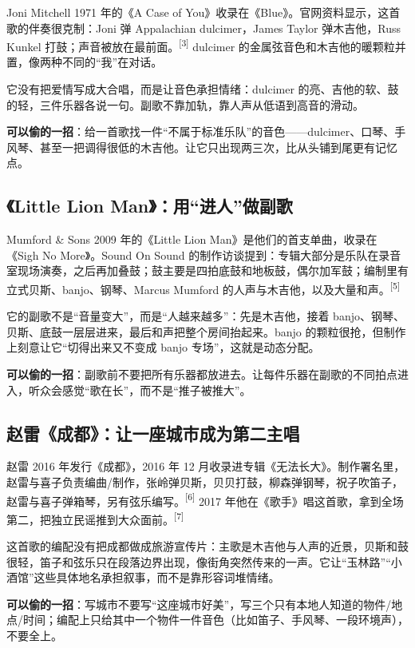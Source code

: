 Joni Mitchell 1971 年的《A Case of You》收录在《Blue》。官网资料显示，这首歌的伴奏很克制：Joni 弹 Appalachian dulcimer，James Taylor 弹木吉他，Russ Kunkel 打鼓；声音被放在最前面。{\textsuperscript{[3]}} dulcimer 的金属弦音色和木吉他的暖颗粒并置，像两种不同的“我”在对话。

它没有把爱情写成大合唱，而是让音色承担情绪：dulcimer 的亮、吉他的软、鼓的轻，三件乐器各说一句。副歌不靠加轨，靠人声从低语到高音的滑动。

\textbf{可以偷的一招}：给一首歌找一件“不属于标准乐队”的音色——dulcimer、口琴、手风琴、甚至一把调得很低的木吉他。让它只出现两三次，比从头铺到尾更有记忆点。

\subsection{《Little Lion Man》：用“进人”做副歌}
\label{sec:folk-case-mumford}

Mumford \& Sons 2009 年的《Little Lion Man》是他们的首支单曲，收录在《Sigh No More》。Sound On Sound 的制作访谈提到：专辑大部分是乐队在录音室现场演奏，之后再加叠鼓；鼓主要是四拍底鼓和地板鼓，偶尔加军鼓；编制里有立式贝斯、banjo、钢琴、Marcus Mumford 的人声与木吉他，以及大量和声。{\textsuperscript{[5]}}

它的副歌不是“音量变大”，而是“人越来越多”：先是木吉他，接着 banjo、钢琴、贝斯、底鼓一层层进来，最后和声把整个房间抬起来。banjo 的颗粒很抢，但制作上刻意让它“切得出来又不变成 banjo 专场”，这就是动态分配。

\textbf{可以偷的一招}：副歌前不要把所有乐器都放进去。让每件乐器在副歌的不同拍点进入，听众会感觉“歌在长”，而不是“推子被推大”。

\subsection{赵雷《成都》：让一座城市成为第二主唱}
\label{sec:folk-case-chengdu}

赵雷 2016 年发行《成都》，2016 年 12 月收录进专辑《无法长大》。制作署名里，赵雷与喜子负责编曲/制作，张岭弹贝斯，贝贝打鼓，柳森弹钢琴，祝子吹笛子，赵雷与喜子弹箱琴，另有弦乐编写。{\textsuperscript{[6]}} 2017 年他在《歌手》唱这首歌，拿到全场第二，把独立民谣推到大众面前。{\textsuperscript{[7]}}

这首歌的编配没有把成都做成旅游宣传片：主歌是木吉他与人声的近景，贝斯和鼓很轻，笛子和弦乐只在段落边界出现，像街角突然传来的一声。它让“玉林路”“小酒馆”这些具体地名承担叙事，而不是靠形容词堆情绪。

\textbf{可以偷的一招}：写城市不要写“这座城市好美”，写三个只有本地人知道的物件/地点/时间；编配上只给其中一个物件一件音色（比如笛子、手风琴、一段环境声），不要全上。

